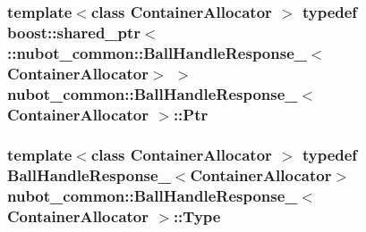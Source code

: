 \hypertarget{structnubot__common_1_1BallHandleResponse___a26914838e95874f3bedfa843d65f0d22}{
\subsubsection[{Ptr}]{\setlength{\rightskip}{0pt plus 5cm}template$<$class Container\-Allocator $>$ typedef boost\-::shared\-\_\-ptr$<$ \-::{\bf nubot\-\_\-common\-::\-Ball\-Handle\-Response\-\_\-}$<$Container\-Allocator$>$ $>$ {\bf nubot\-\_\-common\-::\-Ball\-Handle\-Response\-\_\-}$<$ Container\-Allocator $>$\-::{\bf Ptr}}}\label{structnubot__common_1_1BallHandleResponse___a26914838e95874f3bedfa843d65f0d22}
\hypertarget{structnubot__common_1_1BallHandleResponse___ae42df3848bb38ecbed216ed1efa93149}{
\subsubsection[{Type}]{\setlength{\rightskip}{0pt plus 5cm}template$<$class Container\-Allocator $>$ typedef {\bf Ball\-Handle\-Response\-\_\-}$<$Container\-Allocator$>$ {\bf nubot\-\_\-common\-::\-Ball\-Handle\-Response\-\_\-}$<$ Container\-Allocator $>$\-::{\bf Type}}}\label{structnubot__common_1_1BallHandleResponse___ae42df3848bb38ecbed216ed1efa93149}


